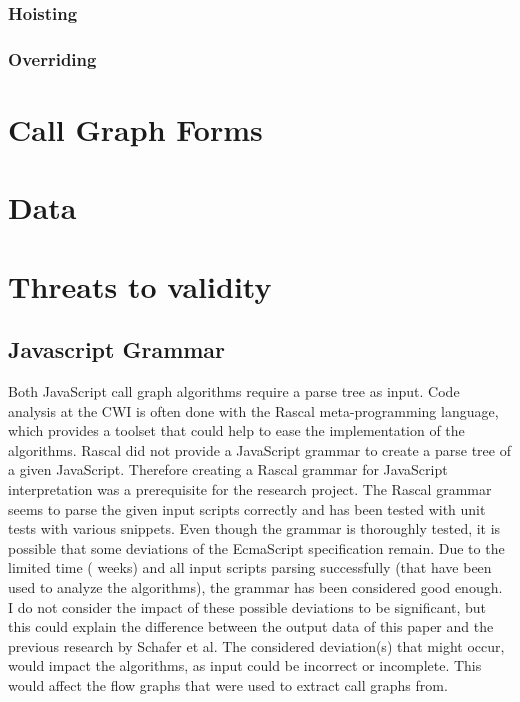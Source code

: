 \documentclass[journal,10pt]{IEEEtran}
\begin{document}
\subsubsection{Hoisting}


\subsubsection{Overriding}


\section{Call Graph Forms}


\section{Data}

\section{Threats to validity}
\subsection{Javascript Grammar}
Both JavaScript call graph algorithms require a parse tree as input. Code analysis at the CWI is often done with the Rascal meta-programming language, which provides a toolset that could help to ease the implementation of the algorithms. Rascal did not provide a JavaScript grammar to create a parse tree of a given JavaScript. Therefore creating a Rascal grammar for JavaScript interpretation was a prerequisite for the research project. The Rascal grammar seems to parse the given input scripts correctly and has been tested with unit tests with various snippets. Even though the grammar is thoroughly tested, it is possible that some deviations of the EcmaScript specification remain.
Due to the limited time ( weeks) and all input scripts parsing successfully (that have been used to analyze the algorithms), the grammar has been considered good enough. I do not consider the impact of these possible deviations to be significant, but this could explain the difference between the output data of this paper and the previous research by Schafer et al. %
The considered deviation(s) that might occur, would impact the algorithms, as input could be incorrect or incomplete. This would affect the flow graphs that were used to extract call graphs from.
\end{document}
